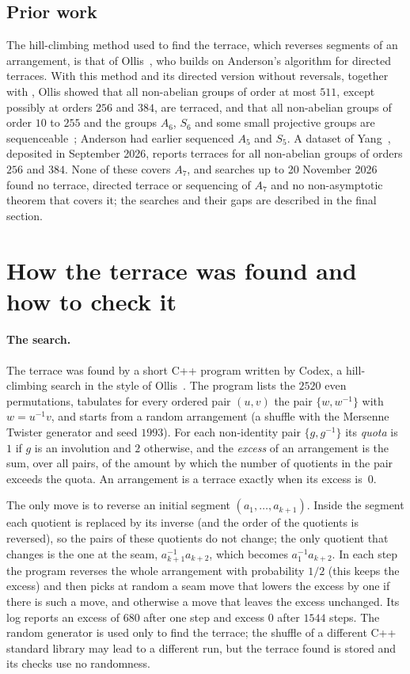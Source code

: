 \documentclass[11pt]{article}
\theoremstyle{definition}
\theoremstyle{remark}
\newcommand{\Alt}{A_7}
\begin{document}
\subsection*{Prior work}
The hill-climbing method used to find the terrace, which reverses segments of
an arrangement, is that of Ollis~\cite[Section~2]{ollis16}, who builds on
Anderson's algorithm for directed terraces. With this method and its
directed version without reversals, together with
\cite[Theorem~2.4]{ollis16}, Ollis showed that all non-abelian groups of order at most $511$, except possibly at orders $256$
and $384$, are terraced, and that all non-abelian groups of order $10$ to
$255$ and the groups $A_6$, $S_6$ and some small projective groups are
sequenceable~\cite[Theorems~2.1 and~2.5]{ollis16}; Anderson had earlier
sequenced $A_5$ and $S_5$. A dataset of Yang~\cite{yang}, deposited in
September 2026, reports terraces for all non-abelian groups of orders $256$
and $384$. None of these covers $\Alt$, and searches up to 20 November 2026
found no terrace, directed terrace or sequencing of $\Alt$ and no
non-asymptotic theorem that covers it; the searches and their gaps are
described in the final section.

\section{How the terrace was found and how to check it}\label{sec:search}

\paragraph{The search.}
The terrace was found by a short C++ program written by Codex, a hill-climbing
search in the style of Ollis~\cite[Section~2]{ollis16}. The program lists the
$2520$ even permutations, tabulates for every ordered pair $(u,v)$ the pair
$\{w,w^{-1}\}$ with $w=u^{-1}v$, and starts from a random arrangement (a
shuffle with the Mersenne Twister generator and seed $1993$). For each
non-identity pair $\{g,g^{-1}\}$ its \emph{quota} is $1$ if $g$ is an
involution and $2$ otherwise, and the \emph{excess} of an arrangement is the
sum, over all pairs, of the amount by which the number of quotients in the
pair exceeds the quota. An arrangement is a terrace exactly when its excess
is~$0$.

The only move is to reverse an initial segment $(a_1,\dots,a_{k+1})$. Inside
the segment each quotient is replaced by its inverse (and the order of the
quotients is reversed), so the pairs of these quotients do not change; the
only quotient that changes is the one at the seam, $a_{k+1}^{-1}a_{k+2}$,
which becomes $a_1^{-1}a_{k+2}$. In each step the program reverses the whole
arrangement with probability $1/2$ (this keeps the excess) and then picks
at random a seam move that lowers the excess by one if there is such a move,
and otherwise a move that leaves the excess unchanged. Its log reports an
excess of $680$ after one step and excess $0$ after $1544$ steps. The random generator is used
only to find the terrace; the shuffle of a different C++ standard library may
lead to a different run, but the terrace found is stored and its checks use no
randomness.
\end{document}
